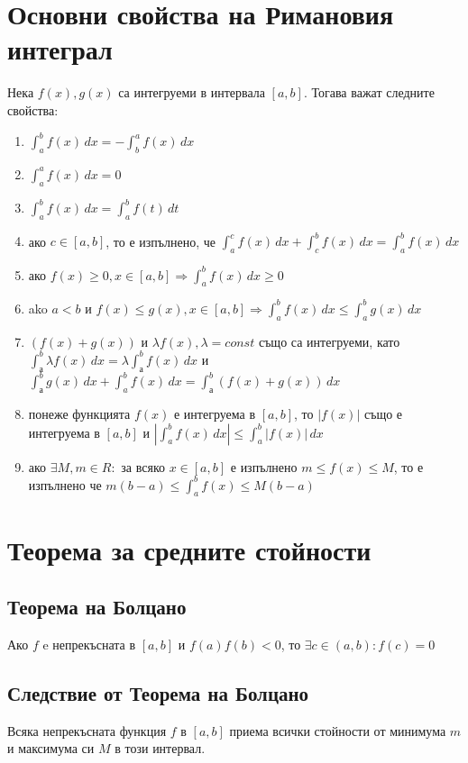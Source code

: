 \documentclass[fleqn,12pt]{article}
\begin{document}
\begin{flushleft}
\section{Основни свойства на Римановия интеграл}
Нека $f(x),g(x)$ са интегруеми в интервала $[a,b]$. Тогава важат следните свойства:
\begin{enumerate}
    \item $\int_{a}^{b}  f(x)\,dx = -\int_{b}^{a} f(x)\,dx$
    \item $\int_{a}^{a}  f(x)\,dx = 0$
    \item $\int_{a}^{b}  f(x)\,dx = \int_{a}^{b}  f(t)\,dt$
    \item ако $c\in[a,b]$, то е изпълнено, че $\int_{a}^{c} f(x)\,dx + \int_{c}^{b} f(x)\,dx = \int_{a}^{b} f(x)\,dx$
    \item ако $f(x)\geq 0, x \in [a,b] \Rightarrow \int_{a}^{b}  f(x)\,dx \geq 0$
    \item ako $a < b$ и $f(x) \leq g(x), x \in [a,b] \Rightarrow \int_{a}^{b}  f(x)\,dx \leq \int_{a}^{b}  g(x)\,dx$
    \item $(f(x) + g(x))$ и $\lambda f(x), \lambda = const$ също са интегруеми, като $\int_{а}^{b} \lambda f(x)\,dx = \lambda \int_{а}^{b} f(x)\,dx$ и $\int_{а}^{b} g(x)\,dx + \int_{a}^{b} f(x)\,dx = \int_{а}^{b} (f(x)+g(x))\,dx$
    \item понеже функцията $f(x)$ е интегруема в $[a,b]$, то $|f(x)|$ също е интегруема в $[a,b]$ и $|\int_{a}^{b} f(x)\,dx| \leq \int_{a}^{b}  |f(x)|\,dx$
    \item ако $\exists M,m \in R:$ за всяко $x \in [a,b]$ е изпълнено $m \leq f(x) \leq M$, то е изпълнено че $m(b-a) \leq \int_{a}^{b} f(x) \leq M(b-a)$
\end{enumerate}

\section{Теорема за средните стойности}
\subsection{Теорема на Болцано}
Ако $f$ e непрекъсната в $[a,b]$ и $f(a)f(b)<0$, то $\exists c \in (a,b): f(c) = 0$

\subsection{Следствие от Теорема на Болцано}
Всяка непрекъсната функция $f$ в $[a,b]$ приема всички стойности от минимума $m$ и максимума си $M$ в този интервал.


\end{flushleft}
\end{document}
